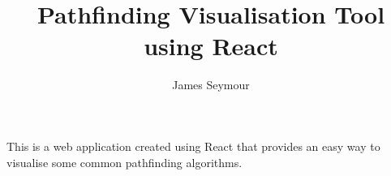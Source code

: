 \documentclass{article}
\title{Pathfinding Visualisation Tool using React}
\author{James Seymour}
\begin{document}
\maketitle
This is a web application created using React that provides an easy way to visualise some common pathfinding algorithms.
\end{document}
